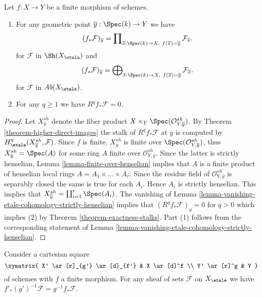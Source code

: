 \begin{proposition}
\label{proposition-finite-higher-direct-image-zero}
Let $f : X \to Y$ be a finite morphism of schemes.
\begin{enumerate}
\item For any geometric point $\overline{y} : \Spec(k) \to Y$ we have
$$
(f_*\mathcal{F})_{\overline{y}} =
\prod\nolimits_{\overline{x} : \Spec(k) \to X,\ f(\overline{x}) =
\overline{y}} \mathcal{F}_{\overline{x}}.
$$
for $\mathcal{F}$ in $\Sh(X_\etale)$ and
$$
(f_*\mathcal{F})_{\overline{y}} =
\bigoplus\nolimits_{\overline{x} : \Spec(k) \to X,\ f(\overline{x}) =
\overline{y}} \mathcal{F}_{\overline{x}}.
$$
for $\mathcal{F}$ in $\textit{Ab}(X_\etale)$.
\item For any $q \geq 1$ we have $R^q f_*\mathcal{F} = 0$.
\end{enumerate}
\end{proposition}

\begin{proof}
Let $X_{\overline{y}}^{sh}$ denote the fiber product
$X \times_Y \Spec(\mathcal{O}_{Y, \overline{y}}^{sh})$.
By Theorem \ref{theorem-higher-direct-images}
the stalk of $R^qf_*\mathcal{F}$ at $\overline{y}$ is computed by
$H_\etale^q(X_{\overline{y}}^{sh}, \mathcal{F})$.
Since $f$ is finite, $X_{\bar y}^{sh}$ is finite over
$\Spec(\mathcal{O}_{Y, \overline{y}}^{sh})$, thus
$X_{\bar y}^{sh} = \Spec(A)$ for some ring $A$
finite over $\mathcal{O}_{Y, \bar y}^{sh}$.
Since the latter is strictly henselian,
Lemma \ref{lemma-finite-over-henselian}
implies that $A$ is a finite product of henselian local rings
$A = A_1 \times \ldots \times A_r$. Since the residue field of
$\mathcal{O}_{Y, \overline{y}}^{sh}$ is separably closed the
same is true for each $A_i$. Hence $A_i$ is strictly henselian.
This implies that $X_{\overline{y}}^{sh} = \coprod_{i = 1}^r \Spec(A_i)$.
The vanishing of
Lemma \ref{lemma-vanishing-etale-cohomology-strictly-henselian}
implies that $(R^qf_*\mathcal{F})_{\overline{y}} = 0$ for $q > 0$
which implies (2) by Theorem \ref{theorem-exactness-stalks}.
Part (1) follows from the corresponding statement of
Lemma \ref{lemma-vanishing-etale-cohomology-strictly-henselian}.
\end{proof}

\begin{lemma}
\label{lemma-finite-pushforward-commutes-with-base-change}
Consider a cartesian square
$$
\xymatrix{
X' \ar[r]_{g'} \ar[d]_{f'} & X \ar[d]^f \\
Y' \ar[r]^g & Y
}
$$
of schemes with $f$ a finite morphism. For any sheaf of sets
$\mathcal{F}$ on $X_\etale$ we have
$f'_*(g')^{-1}\mathcal{F} = g^{-1}f_*\mathcal{F}$.
\end{lemma}

